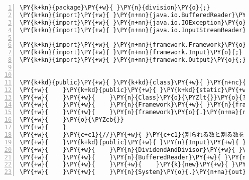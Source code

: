 \begin{Verbatim}[commandchars=\\\{\},numbers=left,firstnumber=1,stepnumber=1,frame=single,fontsize=\small]
\PY{k+kn}{package}\PY{+w}{ }\PY{n}{division}\PY{o}{;}
\PY{k+kn}{import}\PY{+w}{ }\PY{n+nn}{java.io.BufferedReader}\PY{o}{;}
\PY{k+kn}{import}\PY{+w}{ }\PY{n+nn}{java.io.IOException}\PY{o}{;}
\PY{k+kn}{import}\PY{+w}{ }\PY{n+nn}{java.io.InputStreamReader}\PY{o}{;}

\PY{k+kn}{import}\PY{+w}{ }\PY{n+nn}{framework.Framework}\PY{o}{;}
\PY{k+kn}{import}\PY{+w}{ }\PY{n+nn}{framework.Input}\PY{o}{;}
\PY{k+kn}{import}\PY{+w}{ }\PY{n+nn}{framework.Output}\PY{o}{;}


\PY{k+kd}{public}\PY{+w}{ }\PY{k+kd}{class}\PY{+w}{ }\PY{n+nc}{Division}\PY{+w}{ }\PY{k+kd}{extends}\PY{+w}{ }\PY{n}{Framework}\PY{+w}{ }\PY{o}{\PYZob{}}
\PY{+w}{    }\PY{k+kd}{public}\PY{+w}{ }\PY{k+kd}{static}\PY{+w}{ }\PY{k+kt}{void}\PY{+w}{ }\PY{n+nf}{main}\PY{o}{(}\PY{n}{String}\PY{o}{[}\PY{o}{]}\PY{+w}{ }\PY{n}{args}\PY{o}{)}\PY{+w}{ }\PY{k+kd}{throws}\PY{+w}{ }\PY{n}{Exception}\PY{+w}{ }\PY{o}{\PYZob{}}
\PY{+w}{    }\PY{+w}{    }\PY{n}{Class}\PY{o}{\PYZlt{}}\PY{o}{?}\PY{o}{\PYZgt{}}\PY{+w}{ }\PY{n}{c}\PY{+w}{ }\PY{o}{=}\PY{+w}{ }\PY{n}{Class}\PY{o}{.}\PY{n+na}{forName}\PY{o}{(}\PY{l+s}{"division.Division"}\PY{o}{)}\PY{o}{;}
\PY{+w}{    }\PY{+w}{    }\PY{n}{Framework}\PY{+w}{ }\PY{n}{framework}\PY{+w}{ }\PY{o}{=}\PY{+w}{ }\PY{o}{(}\PY{n}{Framework}\PY{o}{)}\PY{+w}{ }\PY{n}{c}\PY{o}{.}\PY{n+na}{newInstance}\PY{o}{(}\PY{o}{)}\PY{o}{;}
\PY{+w}{    }\PY{+w}{    }\PY{n}{framework}\PY{o}{.}\PY{n+na}{run}\PY{o}{(}\PY{o}{)}\PY{o}{;}
\PY{+w}{    }\PY{o}{\PYZcb{}}
\PY{+w}{    }
\PY{+w}{    }\PY{c+c1}{//}\PY{+w}{ }\PY{c+c1}{割られる数と割る数を読み込む}
\PY{+w}{    }\PY{k+kd}{public}\PY{+w}{ }\PY{n}{Input}\PY{+w}{ }\PY{n+nf}{input}\PY{o}{(}\PY{o}{)}\PY{+w}{ }\PY{k+kd}{throws}\PY{+w}{ }\PY{n}{IOException}\PY{+w}{ }\PY{o}{\PYZob{}}
\PY{+w}{    }\PY{+w}{    }\PY{n}{DividendAndDivisor}\PY{+w}{ }\PY{n}{input}\PY{+w}{ }\PY{o}{=}\PY{+w}{ }\PY{k}{new}\PY{+w}{ }\PY{n}{DividendAndDivisor}\PY{o}{(}\PY{o}{)}\PY{o}{;}
\PY{+w}{    }\PY{+w}{    }\PY{n}{BufferedReader}\PY{+w}{ }\PY{n}{reader}\PY{+w}{ }\PY{o}{=}
\PY{+w}{    }\PY{+w}{    }\PY{+w}{    }\PY{k}{new}\PY{+w}{ }\PY{n+nf}{BufferedReader}\PY{o}{(}\PY{k}{new}\PY{+w}{ }\PY{n}{InputStreamReader}\PY{o}{(}\PY{n}{System}\PY{o}{.}\PY{n+na}{in}\PY{o}{)}\PY{o}{)}\PY{o}{;}
\PY{+w}{    }\PY{+w}{    }\PY{n}{System}\PY{o}{.}\PY{n+na}{out}\PY{o}{.}\PY{n+na}{print}\PY{o}{(}\PY{l+s}{"割られる数を入力してください："}\PY{o}{)}\PY{o}{;}

\end{Verbatim}
